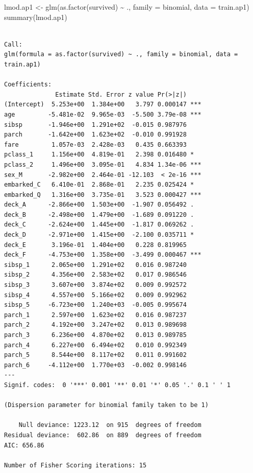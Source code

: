 \documentclass[
  letterpaper,
  DIV=11,
  numbers=noendperiod]{scrartcl}
\newenvironment{Shaded}{\begin{snugshade}}{\end{snugshade}}
\newcommand{\AttributeTok}[1]{\textcolor[rgb]{0.40,0.45,0.13}{#1}}
\newcommand{\FunctionTok}[1]{\textcolor[rgb]{0.28,0.35,0.67}{#1}}
\newcommand{\NormalTok}[1]{\textcolor[rgb]{0.00,0.23,0.31}{#1}}
\newcommand{\OtherTok}[1]{\textcolor[rgb]{0.00,0.23,0.31}{#1}}
\newcommand{\SpecialCharTok}[1]{\textcolor[rgb]{0.37,0.37,0.37}{#1}}
\begin{document}
\begin{Shaded}
\begin{Highlighting}[]
\NormalTok{lmod.ap1 }\OtherTok{\textless{}{-}} \FunctionTok{glm}\NormalTok{(}\FunctionTok{as.factor}\NormalTok{(survived) }\SpecialCharTok{\textasciitilde{}}\NormalTok{ ., }\AttributeTok{family =}\NormalTok{ binomial, }\AttributeTok{data =}\NormalTok{ train.ap1)}
\FunctionTok{summary}\NormalTok{(lmod.ap1)}
\end{Highlighting}
\end{Shaded}

\begin{verbatim}

Call:
glm(formula = as.factor(survived) ~ ., family = binomial, data = train.ap1)

Coefficients:
              Estimate Std. Error z value Pr(>|z|)    
(Intercept)  5.253e+00  1.384e+00   3.797 0.000147 ***
age         -5.481e-02  9.965e-03  -5.500 3.79e-08 ***
sibsp       -1.946e+00  1.291e+02  -0.015 0.987976    
parch       -1.642e+00  1.623e+02  -0.010 0.991928    
fare         1.057e-03  2.428e-03   0.435 0.663393    
pclass_1     1.156e+00  4.819e-01   2.398 0.016480 *  
pclass_2     1.496e+00  3.095e-01   4.834 1.34e-06 ***
sex_M       -2.982e+00  2.464e-01 -12.103  < 2e-16 ***
embarked_C   6.410e-01  2.868e-01   2.235 0.025424 *  
embarked_Q   1.316e+00  3.735e-01   3.523 0.000427 ***
deck_A      -2.866e+00  1.503e+00  -1.907 0.056492 .  
deck_B      -2.498e+00  1.479e+00  -1.689 0.091220 .  
deck_C      -2.624e+00  1.445e+00  -1.817 0.069262 .  
deck_D      -2.971e+00  1.415e+00  -2.100 0.035711 *  
deck_E       3.196e-01  1.404e+00   0.228 0.819965    
deck_F      -4.753e+00  1.358e+00  -3.499 0.000467 ***
sibsp_1      2.065e+00  1.291e+02   0.016 0.987240    
sibsp_2      4.356e+00  2.583e+02   0.017 0.986546    
sibsp_3      3.607e+00  3.874e+02   0.009 0.992572    
sibsp_4      4.557e+00  5.166e+02   0.009 0.992962    
sibsp_5     -6.723e+00  1.240e+03  -0.005 0.995674    
parch_1      2.597e+00  1.623e+02   0.016 0.987237    
parch_2      4.192e+00  3.247e+02   0.013 0.989698    
parch_3      6.236e+00  4.870e+02   0.013 0.989785    
parch_4      6.227e+00  6.494e+02   0.010 0.992349    
parch_5      8.544e+00  8.117e+02   0.011 0.991602    
parch_6     -4.112e+00  1.770e+03  -0.002 0.998146    
---
Signif. codes:  0 '***' 0.001 '**' 0.01 '*' 0.05 '.' 0.1 ' ' 1

(Dispersion parameter for binomial family taken to be 1)

    Null deviance: 1223.12  on 915  degrees of freedom
Residual deviance:  602.86  on 889  degrees of freedom
AIC: 656.86

Number of Fisher Scoring iterations: 15
\end{verbatim}
\end{document}
